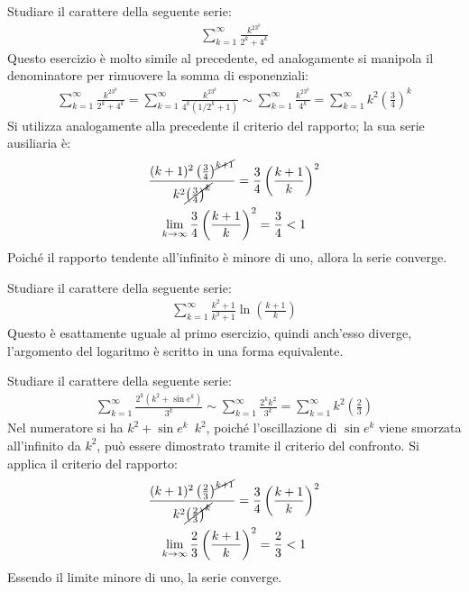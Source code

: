 \documentclass{article}
\numberwithin{equation}{subsection}
\begin{document}
Studiare il carattere della seguente serie:
\begin{gather*}
    \displaystyle\sum_{k=1}^\infty\frac{k^23^k}{2^k+4^k}
\end{gather*}
Questo esercizio è molto simile al precedente, ed analogamente si manipola il denominatore per rimuovere la somma di esponenziali:
\begin{gather*}
    \displaystyle\sum_{k=1}^\infty\frac{k^23^k}{2^k+4^k}=
    \displaystyle\sum_{k=1}^\infty\frac{k^23^k}{4^k(1/2^k+1)}\sim
    \displaystyle\sum_{k=1}^\infty\frac{k^23^k}{4^k}=
    \displaystyle\sum_{k=1}^\infty k^2\left(\frac{3}{4}\right)^k
\end{gather*}
Si utilizza analogamente alla precedente il criterio del rapporto; la sua serie ausiliaria è:
\begin{gather*}
    \displaystyle\frac{(k+1)^2\left(\frac{3}{4}\right)^{\cancel{k+1}}}{k^2\cancel{\left(\frac{3}{4}\right)^k}}=\frac{3}{4}\left(\frac{k+1}{k}\right)^2\\
    \lim_{k\to\infty}\frac{3}{4}\left(\frac{k+1}{k}\right)^2=\frac{3}{4}<1
\end{gather*}
Poiché il rapporto tendente all'infinito è minore di uno, allora la serie converge. 


Studiare il carattere della seguente serie:
\begin{gather*}
    \displaystyle\sum_{k=1}^\infty\frac{k^2+1}{k^3+1}\ln\left(\frac{k+1}{k}\right)
\end{gather*}
Questo è esattamente uguale al primo esercizio, quindi anch'esso diverge, l'argomento del logaritmo è scritto in una forma equivalente. 


Studiare il carattere della seguente serie:
\begin{gather*}
    \displaystyle\sum_{k=1}^\infty\frac{2^k(k^2+\sin e^k)}{3^k}\sim
    \displaystyle\sum_{k=1}^\infty\frac{2^kk^2}{3^k}=
    \displaystyle\sum_{k=1}^\infty k^2\left(\frac{2}{3}\right)
\end{gather*}
Nel numeratore si ha $k^2+\sin e^k$~$k^2$, poiché l'oscillazione di $\sin e^k$ viene smorzata all'infinito da $k^2$, può essere dimostrato tramite il criterio del confronto. 
Si applica il criterio del rapporto:
\begin{gather*}
    \displaystyle\frac{(k+1)^2\left(\frac{2}{3}\right)^{\cancel{k+1}}}{k^2\cancel{\left(\frac{2}{3}\right)^k}}=\frac{3}{4}\left(\frac{k+1}{k}\right)^2\\
    \lim_{k\to\infty}\frac{2}{3}\left(\frac{k+1}{k}\right)^2=\frac{2}{3}<1
\end{gather*}
Essendo il limite minore di uno, la serie converge. 
\end{document}
